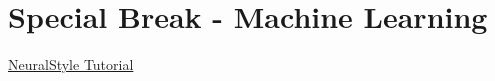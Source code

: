 \section{Special Break - Machine Learning}

\href{https://github.com/anishathalye/neural-style}{NeuralStyle Tutorial}
